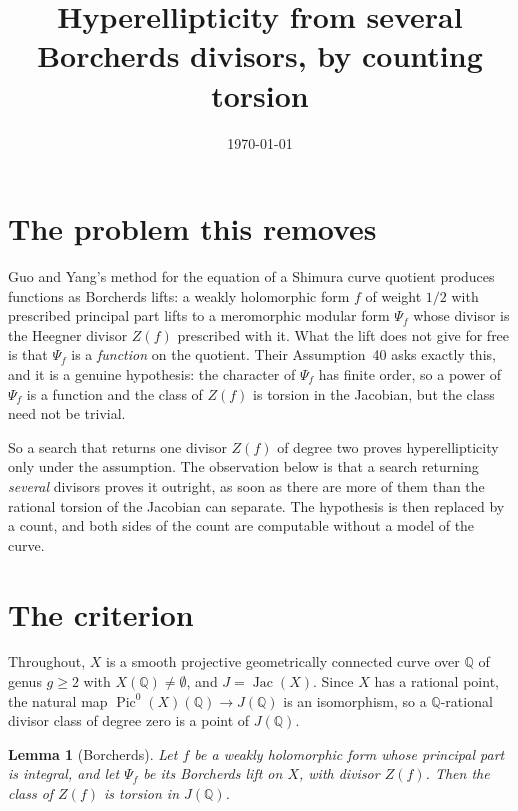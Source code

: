 \documentclass[11pt,reqno]{amsart}
\theoremstyle{plain}
\newtheorem{lemma}[theorem]{Lemma}
\theoremstyle{definition}
\DeclareMathOperator{\Pic}{Pic}
\DeclareMathOperator{\Jac}{Jac}
\newcommand{\Q}{\mathbb{Q}}
\begin{document}
\title{Hyperellipticity from several Borcherds divisors, by counting torsion}
\author{}
\date{\today}
\maketitle

\section{The problem this removes}

Guo and Yang's method for the equation of a Shimura curve quotient produces functions as Borcherds
lifts: a weakly holomorphic form $f$ of weight $1/2$ with prescribed principal part lifts to a
meromorphic modular form $\Psi_f$ whose divisor is the Heegner divisor $Z(f)$ prescribed with it.
What the lift does not give for free is that $\Psi_f$ is a \emph{function} on the quotient. Their
Assumption~40 asks exactly this, and it is a genuine hypothesis: the character of $\Psi_f$ has
finite order, so a power of $\Psi_f$ is a function and the class of $Z(f)$ is torsion in the
Jacobian, but the class need not be trivial.

So a search that returns one divisor $Z(f)$ of degree two proves hyperellipticity only under the
assumption. The observation below is that a search returning \emph{several} divisors proves it
outright, as soon as there are more of them than the rational torsion of the Jacobian can separate.
The hypothesis is then replaced by a count, and both sides of the count are computable without a
model of the curve.

\section{The criterion}

Throughout, $X$ is a smooth projective geometrically connected curve over $\Q$ of genus $g \ge 2$
with $X(\Q) \neq \emptyset$, and $J = \Jac(X)$. Since $X$ has a rational point, the natural map
$\Pic^0(X)(\Q) \to J(\Q)$ is an isomorphism, so a $\Q$-rational divisor class of degree zero is a
point of $J(\Q)$.

\begin{lemma}[Borcherds]\label{lem:torsion}
Let $f$ be a weakly holomorphic form whose principal part is integral, and let $\Psi_f$ be its
Borcherds lift on $X$, with divisor $Z(f)$. Then the class of $Z(f)$ is torsion in $J(\Q)$.
\end{lemma}
\end{document}
